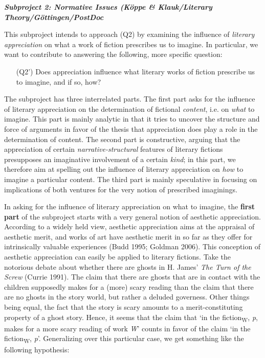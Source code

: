 
\vspace{.2cm}
\noindent\textbf{\emph{Subproject 2: Normative Issues (K\"oppe \& Klauk/Literary Theory/G\"ottingen/PostDoc}}
\vspace{.1cm}

\noindent This subproject intends to approach (Q2) by examining the influence of \emph{literary appreciation} on what a work of fiction prescribes us to imagine. In particular, we want to contribute to answering the following, more specific question:

\vspace{-.1cm}
\begin{itemize}[leftmargin=2cm]
\item[(Q2')] Does appreciation influence what literary works of fiction prescribe us to imagine, and if so, how?
\end{itemize}
\vspace{-.1cm}

\noindent The subproject has three interrelated parts. The first part asks for the influence of literary appreciation on the determination of fictional \emph{content}, i.e. on \emph{what} to imagine. This part is mainly analytic in that it tries to uncover the structure and force of arguments in favor of the thesis that appreciation does play a role in the determination of content. The second part is constructive, arguing that the appreciation of certain \emph{narrative-structural} features of literary fictions presupposes an imaginative involvement of a certain \emph{kind}; in this part, we therefore aim at spelling out the influence of literary appreciation on \emph{how} to imagine a particular content. The third part is mainly speculative in focusing on implications of both ventures for the very notion of prescribed imaginings.

In asking for the influence of literary appreciation on what to imagine, the \textbf{first part} of the subproject starts with a very general notion of aesthetic appreciation. According to a widely held view, aesthetic appreciation aims at the appraisal of aesthetic merit, and works of art have aesthetic merit in so far as they offer for intrinsically valuable experiences (Budd 1995; Goldman 2006). This conception of aesthetic appreciation can easily be applied to literary fictions. Take the notorious debate about whether there are ghosts in H. James' \emph{The Turn of the Screw} (Currie 1991). The claim that there are ghosts that are in contact with the children supposedly makes for a (more) scary reading than the claim that there are no ghosts in the story world, but rather a deluded governess. Other things being equal, the fact that the story is scary amounts to a merit-constituting property of a ghost story. Hence, it seems that the claim that `in the fiction\textsubscript{W}, \emph{p}, makes for a more scary reading of work \emph{W}' counts in favor of the claim `in the fiction\textsubscript{W}, \emph{p}'. Generalizing over this particular case, we get something like the following hypothesis: 

